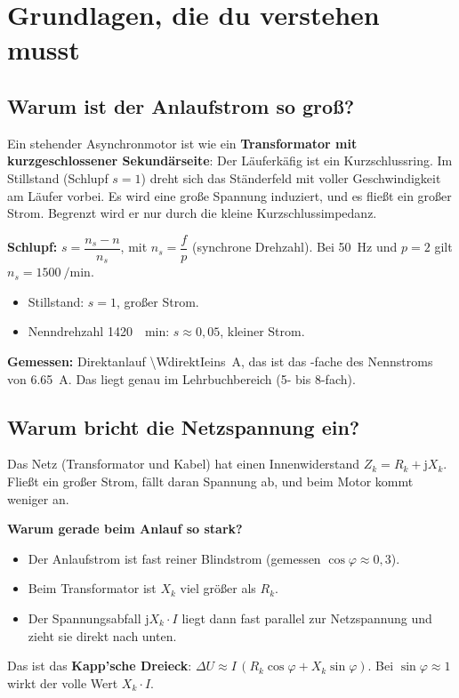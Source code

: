 \documentclass[11pt,a4paper]{article}
\begin{document}
\section{Grundlagen, die du verstehen musst}
\subsection{Warum ist der Anlaufstrom so groß?}
Ein stehender Asynchronmotor ist wie ein \textbf{Transformator mit kurzgeschlossener
Sekundärseite}: Der Läuferkäfig ist ein Kurzschlussring. Im Stillstand (Schlupf
$s = 1$) dreht sich das Ständerfeld mit voller Geschwindigkeit am Läufer vorbei. Es wird
eine große Spannung induziert, und es fließt ein großer Strom. Begrenzt wird er nur durch
die kleine Kurzschlussimpedanz.

\textbf{Schlupf:} $s = \dfrac{n_s - n}{n_s}$, mit $n_s = \dfrac{f}{p}$ (synchrone
Drehzahl). Bei \SI{50}{Hz} und $p=2$ gilt $n_s = \SI{1500}{\per\minute}$.
\begin{itemize}
\item Stillstand: $s = 1$, großer Strom.
\item Nenndrehzahl \SI{1420}{\per\minute}: $s \approx 0{,}05$, kleiner Strom.
\end{itemize}

\textbf{Gemessen:} Direktanlauf \SI{\WdirektIeins}{A}, das ist das \WdirektIN-fache des
Nennstroms von \SI{6,65}{A}. Das liegt genau im Lehrbuchbereich (5- bis 8-fach).

\subsection{Warum bricht die Netzspannung ein?}
Das Netz (Transformator und Kabel) hat einen Innenwiderstand $Z_k = R_k + \mathrm jX_k$.
Fließt ein großer Strom, fällt daran Spannung ab, und beim Motor kommt weniger an.

\textbf{Warum gerade beim Anlauf so stark?}
\begin{itemize}
\item Der Anlaufstrom ist fast reiner Blindstrom (gemessen $\cos\varphi \approx 0{,}3$).
\item Beim Transformator ist $X_k$ viel größer als $R_k$.
\item Der Spannungsabfall $\mathrm jX_k\cdot I$ liegt dann fast parallel zur
  Netzspannung und zieht sie direkt nach unten.
\end{itemize}
Das ist das \textbf{Kapp'sche Dreieck}:
$\Delta U \approx I\,(R_k\cos\varphi + X_k\sin\varphi)$.
Bei $\sin\varphi \approx 1$ wirkt der volle Wert $X_k\cdot I$.
\end{document}
